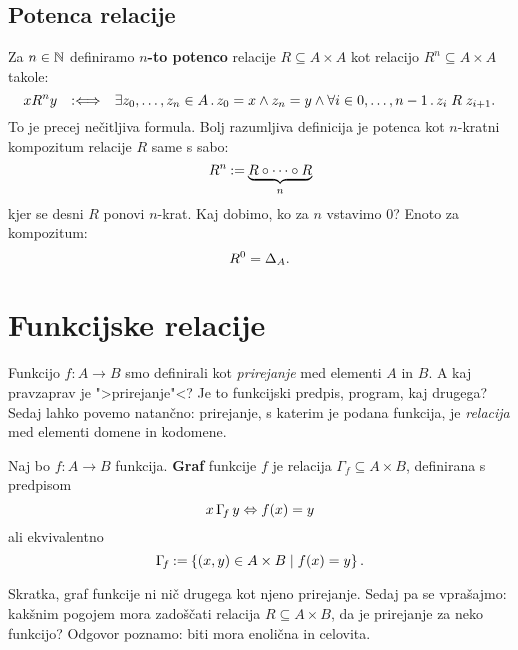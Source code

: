 \subsection{Potenca relacije}

Za $n \in \NN$ definiramo \textbf{$n$-to potenco} relacije $R \subseteq A \times A$ kot relacijo $R^n \subseteq A \times A$ takole:
%
\begin{equation*}
    x R^n y \defiff
    \some{z_0, \ldots, z_n \in A}
    z_0 = x \land z_n = y \land \all{i \in {0, \ldots, n-1}} z_i \rel{R} z_{i+1}.
\end{equation*}
%
To je precej nečitljiva formula. Bolj razumljiva definicija je potenca kot $n$-kratni kompozitum relacije $R$ same s sabo:
%
\begin{equation*}
    R^n \defeq \underbrace{R \circ \cdots \circ R}_n
\end{equation*}
%
kjer se desni $R$ ponovi $n$-krat. Kaj dobimo, ko za $n$ vstavimo $0$? Enoto za kompozitum:
%
\begin{equation*}
    R^0 = \diag[A].
\end{equation*}

\section{Funkcijske relacije}

Funkcijo $f : A \to B$ smo definirali kot \emph{prirejanje} med elementi $A$ in $B$. A
kaj pravzaprav je ">prirejanje"<? Je to funkcijski predpis, program, kaj drugega?
Sedaj lahko povemo natančno: prirejanje, s katerim je podana funkcija, je
\emph{relacija} med elementi domene in kodomene.

\begin{definicija}
  Naj bo $f : A \to B$ funkcija. \textbf{Graf} funkcije $f$ je relacija
  $\Gamma_f \subseteq A \times B$, definirana s predpisom
  \begin{equation*}
    x \,\Gamma_{\!f}\, y \liff f(x) = y
  \end{equation*}
  ali ekvivalentno
  \begin{equation*}
    \Gamma_{\!f} \defeq \set{ (x, y) \in A \times B \such f(x) = y }.
  \end{equation*}
\end{definicija}

Skratka, graf funkcije ni nič drugega kot njeno prirejanje.
%
Sedaj pa se vprašajmo: kakšnim pogojem mora zadoščati relacija $R \subseteq A \times B$, da je prirejanje za neko funkcijo? Odgovor poznamo: biti mora enolična in celovita.

